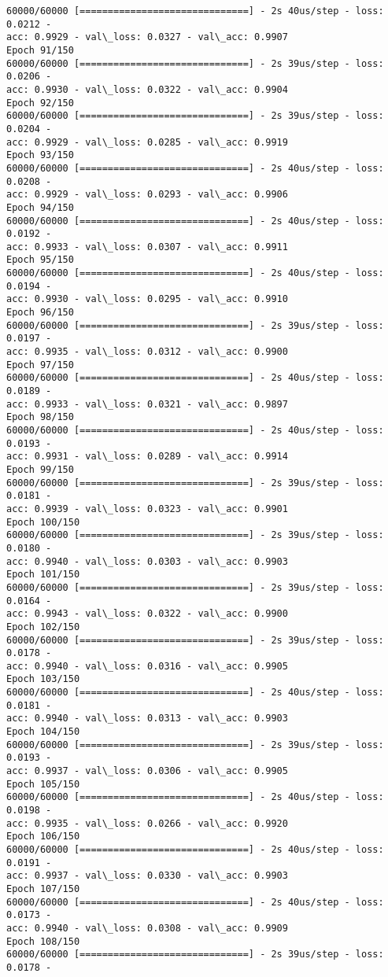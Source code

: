 \documentclass[11pt]{article}
\begin{document}
\begin{Verbatim}[commandchars=\\\{\}]
60000/60000 [==============================] - 2s 40us/step - loss: 0.0212 -
acc: 0.9929 - val\_loss: 0.0327 - val\_acc: 0.9907
Epoch 91/150
60000/60000 [==============================] - 2s 39us/step - loss: 0.0206 -
acc: 0.9930 - val\_loss: 0.0322 - val\_acc: 0.9904
Epoch 92/150
60000/60000 [==============================] - 2s 39us/step - loss: 0.0204 -
acc: 0.9929 - val\_loss: 0.0285 - val\_acc: 0.9919
Epoch 93/150
60000/60000 [==============================] - 2s 40us/step - loss: 0.0208 -
acc: 0.9929 - val\_loss: 0.0293 - val\_acc: 0.9906
Epoch 94/150
60000/60000 [==============================] - 2s 40us/step - loss: 0.0192 -
acc: 0.9933 - val\_loss: 0.0307 - val\_acc: 0.9911
Epoch 95/150
60000/60000 [==============================] - 2s 40us/step - loss: 0.0194 -
acc: 0.9930 - val\_loss: 0.0295 - val\_acc: 0.9910
Epoch 96/150
60000/60000 [==============================] - 2s 39us/step - loss: 0.0197 -
acc: 0.9935 - val\_loss: 0.0312 - val\_acc: 0.9900
Epoch 97/150
60000/60000 [==============================] - 2s 40us/step - loss: 0.0189 -
acc: 0.9933 - val\_loss: 0.0321 - val\_acc: 0.9897
Epoch 98/150
60000/60000 [==============================] - 2s 40us/step - loss: 0.0193 -
acc: 0.9931 - val\_loss: 0.0289 - val\_acc: 0.9914
Epoch 99/150
60000/60000 [==============================] - 2s 39us/step - loss: 0.0181 -
acc: 0.9939 - val\_loss: 0.0323 - val\_acc: 0.9901
Epoch 100/150
60000/60000 [==============================] - 2s 39us/step - loss: 0.0180 -
acc: 0.9940 - val\_loss: 0.0303 - val\_acc: 0.9903
Epoch 101/150
60000/60000 [==============================] - 2s 39us/step - loss: 0.0164 -
acc: 0.9943 - val\_loss: 0.0322 - val\_acc: 0.9900
Epoch 102/150
60000/60000 [==============================] - 2s 39us/step - loss: 0.0178 -
acc: 0.9940 - val\_loss: 0.0316 - val\_acc: 0.9905
Epoch 103/150
60000/60000 [==============================] - 2s 40us/step - loss: 0.0181 -
acc: 0.9940 - val\_loss: 0.0313 - val\_acc: 0.9903
Epoch 104/150
60000/60000 [==============================] - 2s 39us/step - loss: 0.0193 -
acc: 0.9937 - val\_loss: 0.0306 - val\_acc: 0.9905
Epoch 105/150
60000/60000 [==============================] - 2s 40us/step - loss: 0.0198 -
acc: 0.9935 - val\_loss: 0.0266 - val\_acc: 0.9920
Epoch 106/150
60000/60000 [==============================] - 2s 40us/step - loss: 0.0191 -
acc: 0.9937 - val\_loss: 0.0330 - val\_acc: 0.9903
Epoch 107/150
60000/60000 [==============================] - 2s 40us/step - loss: 0.0173 -
acc: 0.9940 - val\_loss: 0.0308 - val\_acc: 0.9909
Epoch 108/150
60000/60000 [==============================] - 2s 39us/step - loss: 0.0178 -

\end{Verbatim}
\end{document}
